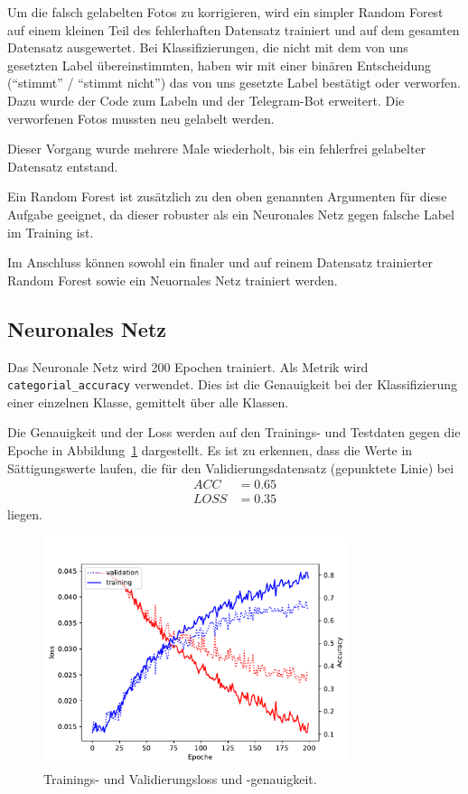 Um die falsch gelabelten Fotos zu korrigieren, wird ein simpler Random
Forest auf einem kleinen Teil des fehlerhaften Datensatz trainiert und
auf dem gesamten Datensatz ausgewertet. Bei Klassifizierungen, die nicht
mit dem von uns gesetzten Label übereinstimmten, haben wir mit einer
binären Entscheidung (\enquote{stimmt} / \enquote{stimmt nicht}) das von uns
gesetzte Label bestätigt oder verworfen. Dazu wurde der Code zum Labeln
und der Telegram-Bot erweitert. Die verworfenen Fotos mussten neu
gelabelt werden.

Dieser Vorgang wurde mehrere Male wiederholt, bis ein fehlerfrei
gelabelter Datensatz entstand.

Ein Random Forest ist zusätzlich zu den oben genannten Argumenten für
diese Aufgabe geeignet, da dieser robuster als ein Neuronales Netz gegen
falsche Label im Training ist.

Im Anschluss können sowohl ein finaler und auf reinem Datensatz
trainierter Random Forest sowie ein Neuornales Netz trainiert werden.

\hypertarget{neuronales-netz-1}{%
\subsection{Neuronales Netz}\label{neuronales-netz-1}}

Das Neuronale Netz wird 200 Epochen trainiert. Als Metrik wird
\texttt{categorial\_accuracy} verwendet. Dies ist die Genauigkeit bei
der Klassifizierung einer einzelnen Klasse, gemittelt über alle Klassen.

Die Genauigkeit und der Loss werden auf den Trainings- und Testdaten
gegen die Epoche in Abbildung~\ref{fig:train_nn} dargestellt. Es ist zu erkennen, dass die
Werte in Sättigungswerte laufen, die für den Validierungsdatensatz (gepunktete Linie) bei
\begin{align}
  ACC  &=  \num{0.65} \\
  LOSS &= \num{0.35}
\end{align}
liegen.

\begin{figure}
\centering
\includegraphics[width=0.8\textwidth]{content/train_nn.pdf}
\caption{Trainings- und Validierungsloss und -genauigkeit.}%
\label{fig:train_nn}
\end{figure}

